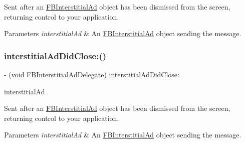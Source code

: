 Sent after an \hyperlink{interfaceFBInterstitialAd}{F\+B\+Interstitial\+Ad} object has been dismissed from the screen, returning control to your application.


\begin{DoxyParams}{Parameters}
{\em interstitial\+Ad} & An \hyperlink{interfaceFBInterstitialAd}{F\+B\+Interstitial\+Ad} object sending the message. \\
\hline
\end{DoxyParams}
\mbox{\label{protocolFBInterstitialAdDelegate_01-p_a764df2f13294f6db329aad7e96b99da1}} 
\subsubsection{\texorpdfstring{interstitial\+Ad\+Did\+Close\+:()}{interstitialAdDidClose:()}\hspace{0.1cm}{\footnotesize\ttfamily [5/5]}}
{\footnotesize\ttfamily -\/ (void F\+B\+Interstitial\+Ad\+Delegate) interstitial\+Ad\+Did\+Close\+: \begin{DoxyParamCaption}\item[{(\hyperlink{interfaceFBInterstitialAd}{F\+B\+Interstitial\+Ad} $\ast$)}]{interstitial\+Ad }\end{DoxyParamCaption}\hspace{0.3cm}{\ttfamily [optional]}}

Sent after an \hyperlink{interfaceFBInterstitialAd}{F\+B\+Interstitial\+Ad} object has been dismissed from the screen, returning control to your application.


\begin{DoxyParams}{Parameters}
{\em interstitial\+Ad} & An \hyperlink{interfaceFBInterstitialAd}{F\+B\+Interstitial\+Ad} object sending the message. \\
\hline
\end{DoxyParams}
\mbox{\label{protocolFBInterstitialAdDelegate_01-p_a6e42af81b5d6382056651aee8b71c720}} 
